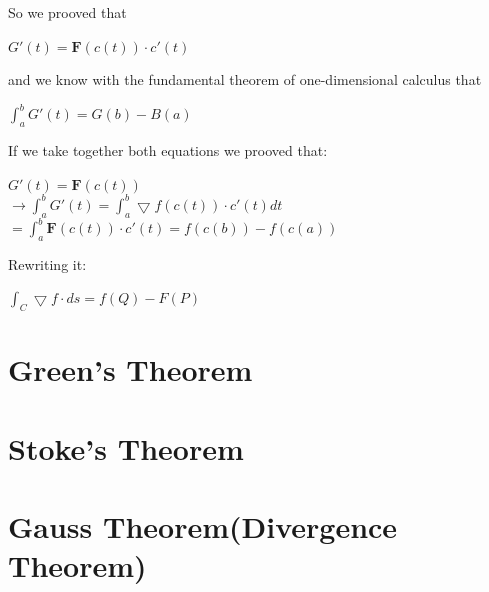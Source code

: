 \documentclass[12pt,a4paper]{article}
\begin{document}
\begin{itemize}
		So we prooved that
		\begin{center}
			$G'(t) = \textbf{F}(c(t))\cdot c'(t)$
		\end{center}
		and we know with the fundamental theorem of one-dimensional calculus that
		\begin{center}
			$\int_{a}^{b} G'(t) = G(b)-B(a)$
		\end{center}
		If we take together both equations we prooved that:
		\begin{center}
			$G'(t) = \textbf{F}(c(t))$ \\
			$\rightarrow \int_{a}^{b} G'(t) = \int_{a}^{b} \bigtriangledown f(c(t))\cdot c'(t)dt$ \\$ = \int_{a}^{b} \textbf{F}(c(t)) \cdot c'(t) = f(c(b)) - f(c(a))$
		\end{center}
		Rewriting it:
		\begin{center}
			$\int_{C}^{}\bigtriangledown f\cdot ds = f(Q)-F(P)$
		\end{center}
		
	\end{itemize}
	
	\newpage
	
	\section{Green's Theorem}
	
	\newpage
	
	\section{Stoke's Theorem}
	
	\newpage
	
	\section{Gauss Theorem(Divergence Theorem)}
	
	
	

	
	
	

	
\end{document}
